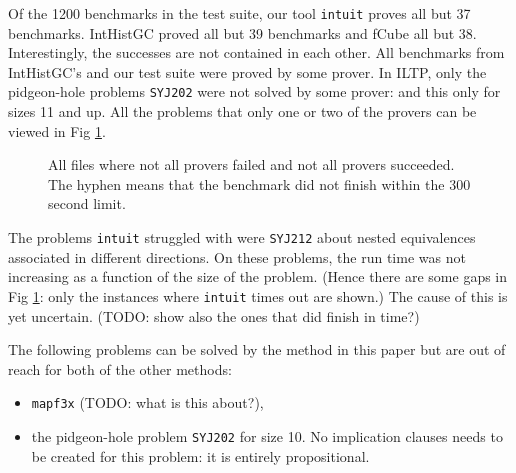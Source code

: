 \documentclass{llncs}
\begin{document}
Of the 1200 benchmarks in the test suite, our tool {\tt intuit} proves all but 37 benchmarks.
IntHistGC proved all but 39 benchmarks and fCube all but 38. Interestingly, the successes
are not contained in each other. All benchmarks from IntHistGC's and our test suite were proved
by some prover. In ILTP, only the pidgeon-hole problems {\tt SYJ202} were not solved by some prover:
and this only for sizes 11 and up. All the problems that only one or two of the provers can be viewed
in Fig \ref{fig:interesting}.

\begin{figure}[htd]
\centering

\caption{
All files where not all provers failed and not all provers succeeded.
The hyphen means that the benchmark did not finish within the 300 second limit.
\label{fig:interesting}
}
\end{figure}

The problems {\tt intuit} struggled with were {\tt SYJ212} about
nested equivalences associated in different directions. On these problems, the run time was not
increasing as a function of the size of the problem. (Hence there are some gaps in Fig \ref{fig:interesting}: only the instances where
{\tt intuit} times out are shown.) The cause of this is yet uncertain. (TODO: show also the ones that did finish in time?)




The following problems can be solved by the method in this paper but are out of reach for both of the other methods:

\begin{itemize}
\item {\tt mapf3x} (TODO: what is this about?),
\item the pidgeon-hole problem {\tt SYJ202} for size 10. No implication clauses needs to be created for this problem: it is entirely propositional.
\end{itemize}
\end{document}
